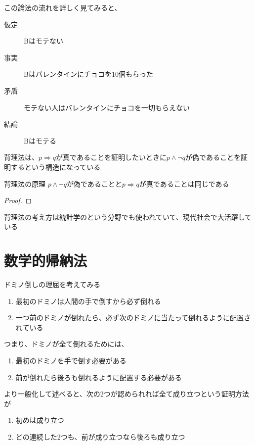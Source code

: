 \documentclass[b5paper,12pt]{jsarticle}
\begin{document}
この論法の流れを詳しく見てみると、

\begin{description}
  \item[仮定] Bはモテない
  \item[事実] Bはバレンタインにチョコを10個もらった
  \item[矛盾] モテない人はバレンタインにチョコを一切もらえない
  \item[結論] Bはモテる
\end{description}

背理法は、$p \Rightarrow q$が真であることを証明したいときに$p \land \neg q$が偽であることを証明するという構造になっている

\begin{theorem}{背理法の原理}
  $p \land \neg q$が偽であることと$p \Rightarrow q$が真であることは同じである
\end{theorem}

\begin{proof}
\end{proof}

背理法の考え方は統計学のという分野でも使われていて、現代社会で大活躍している

\sectionline
\section{数学的帰納法}

ドミノ倒しの理屈を考えてみる

\begin{enumerate}
  \item 最初のドミノは人間の手で倒すから必ず倒れる
  \item 一つ前のドミノが倒れたら、必ず次のドミノに当たって倒れるように配置されている
\end{enumerate}

つまり、ドミノが全て倒れるためには、

\begin{enumerate}
  \item 最初のドミノを手で倒す必要がある
  \item 前が倒れたら後ろも倒れるように配置する必要がある
\end{enumerate}

より一般化して述べると、次の2つが認められれば全て成り立つという証明方法が

\begin{enumerate}
  \item 初めは成り立つ
  \item どの連続した2つも、前が成り立つなら後ろも成り立つ
\end{enumerate}
\end{document}
